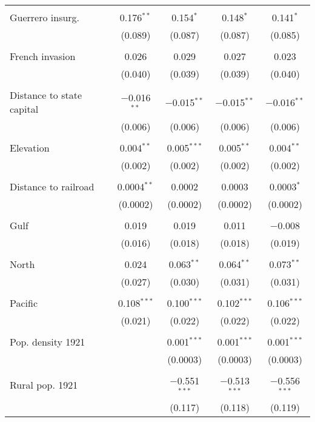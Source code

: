\begin{table}[!htbp]
\begin{tabular}{@{\extracolsep{5pt}}lccccc}
  & & & & & \\ 
 Guerrero insurg. &  & 0.176$^{**}$ & 0.154$^{*}$ & 0.148$^{*}$ & 0.141$^{*}$ \\ 
  &  & (0.089) & (0.087) & (0.087) & (0.085) \\ 
  & & & & & \\ 
 French invasion &  & 0.026 & 0.029 & 0.027 & 0.023 \\ 
  &  & (0.040) & (0.039) & (0.039) & (0.040) \\ 
  & & & & & \\ 
 Distance to state capital &  & $-$0.016$^{**}$ & $-$0.015$^{**}$ & $-$0.015$^{**}$ & $-$0.016$^{**}$ \\ 
  &  & (0.006) & (0.006) & (0.006) & (0.006) \\ 
  & & & & & \\ 
 Elevation &  & 0.004$^{**}$ & 0.005$^{***}$ & 0.005$^{**}$ & 0.004$^{**}$ \\ 
  &  & (0.002) & (0.002) & (0.002) & (0.002) \\ 
  & & & & & \\ 
 Distance to railroad &  & 0.0004$^{**}$ & 0.0002 & 0.0003 & 0.0003$^{*}$ \\ 
  &  & (0.0002) & (0.0002) & (0.0002) & (0.0002) \\ 
  & & & & & \\ 
 Gulf &  & 0.019 & 0.019 & 0.011 & $-$0.008 \\ 
  &  & (0.016) & (0.018) & (0.018) & (0.019) \\ 
  & & & & & \\ 
 North &  & 0.024 & 0.063$^{**}$ & 0.064$^{**}$ & 0.073$^{**}$ \\ 
  &  & (0.027) & (0.030) & (0.031) & (0.031) \\ 
  & & & & & \\ 
 Pacific &  & 0.108$^{***}$ & 0.100$^{***}$ & 0.102$^{***}$ & 0.106$^{***}$ \\ 
  &  & (0.021) & (0.022) & (0.022) & (0.022) \\ 
  & & & & & \\ 
 Pop. density 1921 &  &  & 0.001$^{***}$ & 0.001$^{***}$ & 0.001$^{***}$ \\ 
  &  &  & (0.0003) & (0.0003) & (0.0003) \\ 
  & & & & & \\ 
 Rural pop. 1921 &  &  & $-$0.551$^{***}$ & $-$0.513$^{***}$ & $-$0.556$^{***}$ \\ 
  &  &  & (0.117) & (0.118) & (0.119) \\ 

\end{tabular}
\end{table}
